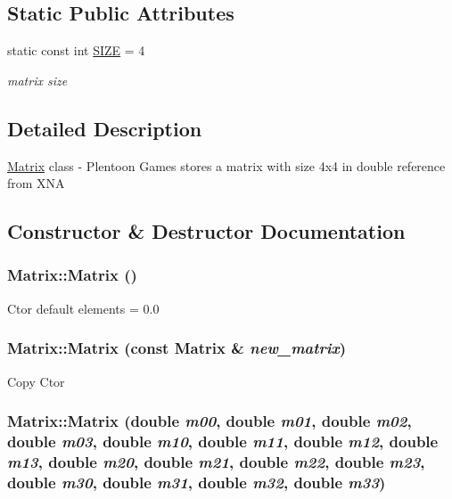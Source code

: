 \subsection*{Static Public Attributes}
\begin{CompactItemize}
\item 
\hypertarget{class_matrix_ae807d9d289029df29d3faa7533fd266}{
static const int \hyperlink{class_matrix_ae807d9d289029df29d3faa7533fd266}{SIZE} = 4}
\label{class_matrix_ae807d9d289029df29d3faa7533fd266}

\begin{CompactList}\small\item\em matrix size \item\end{CompactList}\end{CompactItemize}


\subsection{Detailed Description}
\hyperlink{class_matrix}{Matrix} class - Plentoon Games stores a matrix with size 4x4 in double reference from XNA 

\subsection{Constructor \& Destructor Documentation}
\hypertarget{class_matrix_2dba13c45127354c9f75ef576f49269b}{
\subsubsection[Matrix]{\setlength{\rightskip}{0pt plus 5cm}Matrix::Matrix ()}}
\label{class_matrix_2dba13c45127354c9f75ef576f49269b}


Ctor default elements = 0.0 \hypertarget{class_matrix_4d7cf7754d036e7470687c161d8615b1}{
\subsubsection[Matrix]{\setlength{\rightskip}{0pt plus 5cm}Matrix::Matrix (const {\bf Matrix} \& {\em new\_\-matrix})}}
\label{class_matrix_4d7cf7754d036e7470687c161d8615b1}


Copy Ctor \hypertarget{class_matrix_dad76ccf4d66a1550d9bbb693cae8bbf}{
\subsubsection[Matrix]{\setlength{\rightskip}{0pt plus 5cm}Matrix::Matrix (double {\em m00}, \/  double {\em m01}, \/  double {\em m02}, \/  double {\em m03}, \/  double {\em m10}, \/  double {\em m11}, \/  double {\em m12}, \/  double {\em m13}, \/  double {\em m20}, \/  double {\em m21}, \/  double {\em m22}, \/  double {\em m23}, \/  double {\em m30}, \/  double {\em m31}, \/  double {\em m32}, \/  double {\em m33})}}
\label{class_matrix_dad76ccf4d66a1550d9bbb693cae8bbf}



